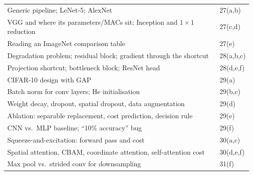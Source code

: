 \documentclass[12pt,a4paper]{article}
\begin{document}
\begin{center}
\begin{tabular}{@{}>{\raggedright\arraybackslash}p{}l@{}}
Generic pipeline; LeNet-5; AlexNet & 27(a,b)\\
VGG and where its parameters/MACs sit; Inception and $1\times1$ reduction & 27(c,d)\\
Reading an ImageNet comparison table & 27(e)\\
Degradation problem; residual block; gradient through the shortcut & 28(a,b,c)\\
Projection shortcut; bottleneck block; ResNet head & 28(d,e,f)\\
CIFAR-10 design with GAP & 29(a)\\
Batch norm for conv layers; He initialisation & 29(b,c)\\
Weight decay, dropout, spatial dropout, data augmentation & 29(d)\\
Ablation: separable replacement, cost prediction, decision rule & 29(e)\\
CNN vs.\ MLP baseline; ``10\% accuracy'' bug & 29(f)\\
Squeeze-and-excitation: forward pass and cost & 30(a,c)\\
Spatial attention, CBAM, coordinate attention, self-attention cost & 30(d,e,f)\\
Max pool vs.\ strided conv for downsampling & 31(f)\\
\bottomrule
\end{tabular}
\end{center}
\end{document}
